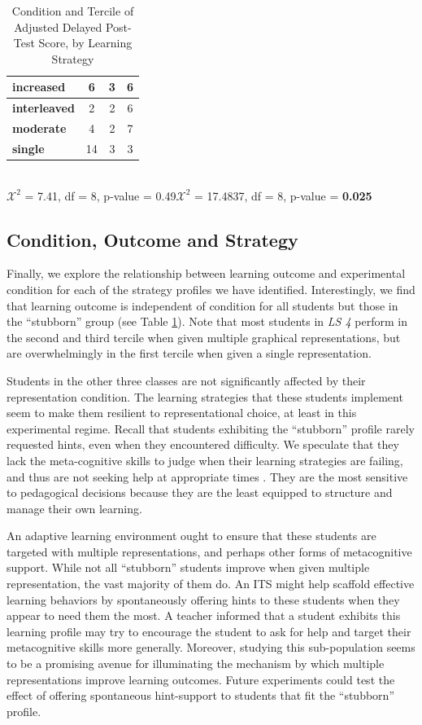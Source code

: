 \documentclass{edm_template}
\begin{document}
\begin{table}[htbp]
\begin{center}
\begin{tabular}{|l || c | c | c |}
  \textbf{increased}&    6&  3&  6 \\ \hline
  \textbf{interleaved}&  2&  2&  6 \\ \hline
  \textbf{moderate}&     4&  2& 7 \\ \hline
  \textbf{single}&       14&  3&  3 \\ \hline
 \end{tabular}
\\$\mathcal{X}^2$ = 7.41, df = 8, p-value = 0.49\hspace{15pt}$\mathcal{X}^2$ = 17.4837, df = 8, p-value = {\bf 0.025}
\end{center}
\caption{Condition and Tercile of Adjusted Delayed Post-Test Score, by Learning Strategy}
\label{tab:exp-and-score-by-LS}
\end{table}


\subsection{Condition, Outcome and Strategy}

Finally, we explore the relationship between learning outcome and experimental condition for each of the strategy profiles we have identified. Interestingly, we find that learning outcome is independent of condition for all students but those in the ``stubborn'' group (see Table \ref{tab:exp-and-score-by-LS}).  Note that most students in \emph{LS 4} perform in the second and third tercile when given multiple graphical representations, but are overwhelmingly in the first tercile when given a single representation. 

Students in the other three classes are not significantly affected by their representation condition. The learning strategies that these students implement seem to make them resilient to representational choice, at least in this experimental regime. Recall that students exhibiting the ``stubborn'' profile rarely requested hints, even when they encountered difficulty. We speculate that they lack the meta-cognitive skills to judge when their learning strategies are failing, and thus are not seeking help at appropriate times \cite{Aleven2006}. They are the most sensitive to pedagogical decisions because they are the least equipped to structure and manage their own learning. 

An adaptive learning environment ought to ensure that these students are targeted with multiple representations, and perhaps other forms of metacognitive support. While not all ``stubborn'' students improve when given multiple representation, the vast majority of them do. An ITS might help scaffold effective learning behaviors by spontaneously offering hints to these students when they appear to need them the most. A teacher informed that a student exhibits this learning profile may try to encourage the student to ask for help and target their metacognitive skills more generally. Moreover, studying this sub-population seems to be a promising avenue for illuminating the mechanism by which multiple representations improve learning outcomes. Future experiments could test the effect of offering spontaneous hint-support to students that fit the ``stubborn'' profile.
\end{document}
